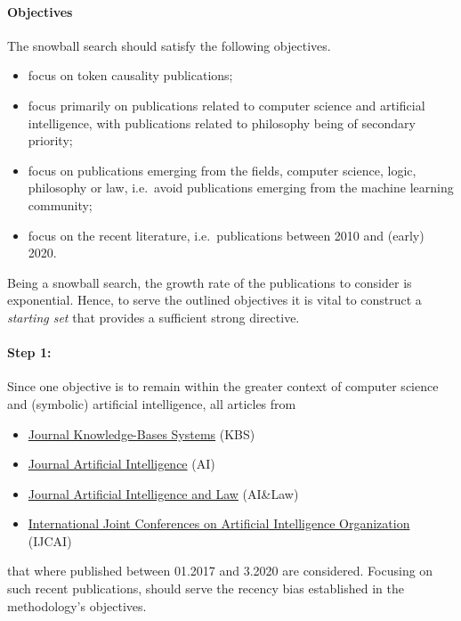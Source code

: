 \documentclass[11pt,a4paper]{book}
\theoremstyle{definition}
\theoremstyle{definition}
\theoremstyle{definition}
\theoremstyle{remark}
\begin{document}
\paragraph{Objectives} The snowball search should satisfy the following objectives.
\begin{itemize}
\item focus on token causality publications;
\item focus primarily on publications related to computer science and artificial intelligence, with publications related to philosophy being of secondary priority;
\item focus on publications emerging from the fields, computer science, logic, philosophy or law, i.e.\ avoid publications emerging from the machine learning community;
\item focus on the recent literature, i.e.\ publications between 2010 and (early) 2020.
\end{itemize}
Being a snowball search, the growth rate of the publications to consider is exponential. Hence, to serve the outlined objectives it is vital to construct a \emph{starting set} that provides a sufficient strong directive.
\bigskip

\paragraph{Step 1:} Since one objective is to remain within the greater context of computer science and (symbolic) artificial intelligence, all articles from  
\begin{itemize}
\item \href{https://www.journals.elsevier.com/knowledge-based-systems}{Journal Knowledge-Bases Systems} (KBS)
\item \href{https://www.journals.elsevier.com/artificial-intelligence}{Journal Artificial Intelligence} (AI)
\item \href{https://www.springer.com/journal/10506}{Journal Artificial Intelligence and Law} (AI\&Law)
\item \href{https://www.ijcai.org/}{International Joint Conferences on Artificial Intelligence Organization} (IJCAI)
\end{itemize}
that where published between 01.2017 and 3.2020 are considered. Focusing on such recent publications, should serve the recency bias established in the methodology's objectives. 

\medskip
\end{document}
